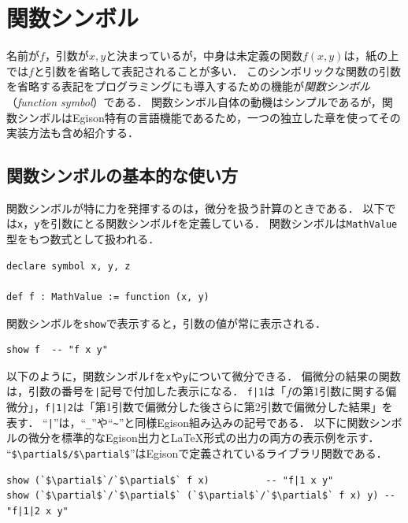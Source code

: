 \chapter{関数シンボル}\label{funcsym}

名前が$f$，引数が$x,y$と決まっているが，中身は未定義の関数$f(x,y)$は，紙の上では$f$と引数を省略して表記されることが多い．
このシンボリックな関数の引数を省略する表記をプログラミングにも導入するための機能が\emph{関数シンボル}（\emph{function symbol}）である．
関数シンボル自体の動機はシンプルであるが，関数シンボルはEgison特有の言語機能であるため，一つの独立した章を使ってその実装方法も含め紹介する．

\section{関数シンボルの基本的な使い方}\label{funcsym-intro}

関数シンボルが特に力を発揮するのは，微分を扱う計算のときである．
以下では\lstinline{x}，\lstinline{y}を引数にとる関数シンボル\lstinline{f}を定義している．
関数シンボルは\lstinline{MathValue}型をもつ数式として扱われる．

\begin{lstlisting}[language=egison,numbers=none]
declare symbol x, y, z

def f : MathValue := function (x, y)
\end{lstlisting}

関数シンボルを\lstinline{show}で表示すると，引数の値が常に表示される．

\begin{lstlisting}[language=egison,numbers=none]
show f  -- "f x y"
\end{lstlisting}

以下のように，関数シンボル\lstinline{f}を\lstinline{x}や\lstinline{y}について微分できる．
偏微分の結果の関数は，引数の番号を\verb!|!記号で付加した表示になる．
\verb!f|1!は「$f$の第1引数に関する偏微分」，\verb!f|1|2!は「第1引数で偏微分した後さらに第2引数で偏微分した結果」を表す．
``\verb!|!''は，``\verb!_!''や``\verb!~!''と同様Egison組み込みの記号である．
以下に関数シンボルの微分を標準的なEgison出力とLaTeX形式の出力の両方の表示例を示す．
``\lstinline[mathescape]{$\partial$/$\partial$}''はEgisonで定義されているライブラリ関数である．

\begin{lstlisting}[language=egison,numbers=none]
show (`$\partial$`/`$\partial$` f x)          -- "f|1 x y"
show (`$\partial$`/`$\partial$` (`$\partial$`/`$\partial$` f x) y) -- "f|1|2 x y"
\end{lstlisting}

